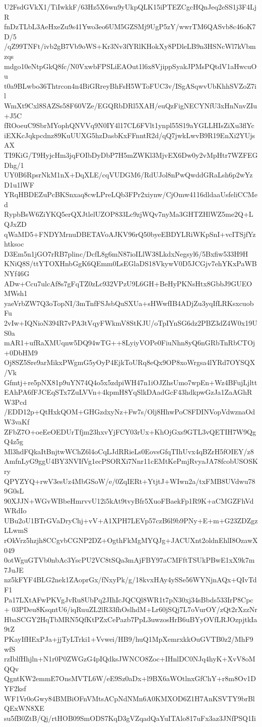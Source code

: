 U2FsdGVkX1/TiIwkkF/63Hz5X6wn9yUkpQLK15iPTEZCgcHQnJeq2eSS1j3F4LjR
fnDzTLbL3AeHxeZu9s41Ywo3eo6UM5GZSMj9UgP5zY/wwrTM6QASvb8c46oK7D/5
/qZ99TNFt/ivb2gB7Vb9oWS+Kr3Nv3fYRlKHokXy8PDleLB9n3HSNcWl7kVbmzqs
mdgo10eNtpGkQ8fc/N0VxwbFPSLiEAOut1l6x8VjippSyakJPMsPQtdV1aHwcuOu
t0a9BLwbo36Thtrcon4n4BiGRreyBhFsH5WToFUC3v/ISgASqwvUbKhhSVZoZ7il
WmXt9Cxl8SAZSs58F60VZe/EGQRbDRl5XAH/euQzFigNECYNfU3xHnNnvZIu+J5C
fROoeuC9SbrMYophQNVVq9N0IY4l17CL6FVlt1ynpl55S19aYGLLHIsZiXu3flYc
iEXKcJqkpcdnz89KuUUXG5hzDasbKxFFnntR2d/qQ7jwkLwvB9R19EnXi2YUjsAX
TI9KiG/T9HyjcHm3jqFOIbDyDbP7H5mZWKl3MjvEX6Dw0y2vMpHtr7WZFEGDhg/1
UY0B6RpsrNkM1nX+DqXLE/cqVUDGM6/RdUJol8nPwQwddGRaLsh6p2wYzD1u1lWF
YRqHBDEZuPcBKSnxaq8cwLPreLQb3FPr2xiynw/CjOmw4116dldaaUsfeliCCMed
RypbBsW6ZiYKQ5erQXJtlelUZOP833Lc9zjWQv7nyMa3GHTZHlWZ5me2Q+LQJxZD
qWaMD5+FNDYMrnuDBETAVoAJKV96rQ50byeEBDYLRiWKpSnI+vcITSjfYzhtksoc
D3Em5n1jGO7rRB7plinc/DcfL8g6mN87ioILlW38LkdxNegsyl6/5Bxfiw533H9H
KNiQ8S/ttYTOXHnbGgK6QEmm0LsEGlaDS18VkywV0D5JCGjv7ehYKxPaWBNYf46G
ADw+Ccu7ulcAf8s7gFqTZ0zLc932VPzU9L6GH+BeHyPKNsHtx8GbbJ9GUEOMWsh1
yaeVrbZW7Q3oTopNI/3mTnfFSJsbQuSXUa+sHWwfIB4ADjZu3yqIfLRKsxcuobFu
2vIw+IQNioN394R7vPA3tVqyFWkmV8StKJU/oTpIYnSG6dz2PBZ3dZ4W0x19US0a
mAR1+ufRaXMUqnw5DQ94wTG++8LyiyVOPe0FiuNhn8yQ6nGRbTnRbCTOj+0DbHM9
Oj8SZ5Sre9arMikxPWgmG5yOyP4EjkToURq8eQx9OP8xoWrgsa4lYRd7OYSQX/Vk
Gfmtj+re5pNX81p9uYN74Q4o5x5zdpiWH47n1iOJZhsUmo7wpEn+Wz4BFujLjltt
EAhPA6fFJCEqSTx7ZuLVVn+4kpmH8YqSlkDAadGcF43hdkpwGzJa1ZaAGhRW3Pcd
/EDD12p+QtHxkQOM+GHGzdxyNz+Fw7s/Olj8HhwPoC8FDINVopVdwznaOdW3vaKf
ZFbZ7O+oeEeOEDUrTfjm23hxvYjFCY03rUx+KhOjGxs9GTL3vQETIH7W9QgQ4z5g
Ml3hdFQkaItBnjtwWChZ6l4oCqLJdRRieLs0EovsGfqTIhUvx4qBZrH5fOIEY/z8
AmfnLyG9ggU4BY3NVIfVg1ecPSORXi7Nnr11cEMtKePmjRvyaJA78fcobUSOSKry
QPYZYQ+rwV3esUz4MbGSoW/e/0ZqIERt+YtjtJ+WIwn2a/txFMB8UVdwu789G0sL
90XJJN+WGvWBbeHmrvvU12i5kAt9tvyBfr5XuoFBaekFp1R9K+aCMGZFhVdWRdIo
UBu2oU1BTrGVaDryChj+vV+A1XPH7LEVp57czB6l9b9PNy+E+m+G23ZDZgzLLwmS
rOkVrz5hzjh8CCgvbCGNP2DZ+OgthFkMgMYQJg+JACUXnt2oldnEhlI8OzawX049
0otWguGTVb0nbAc3YscPU2VC8tSQa3mAjFBY97aCMFftTSUkPBwE1xX9k7m7JuJE
nz5kFYF4BLG2nek1ZAoprGx/fNxyPk/g/18kvxHAy4ySSe56WYNjnAQx+QIvTdF1
Pa17LXtAFwPKVgJvRu8UbPq2JIhIcJQCQl8WR1t7pN30xj34sBbds533IrP8Cpc+
03PDeu8KsqntU6/iqRuuZL2lR33fhOslhdM+Lr60jSQj7L7oVurOY/zQt2rXzzNr
HbaSCGY2HqTbMRN5QfKtPZxCePazb7PpL3uwzosHrB6uBYyOVfLRJOzpjtkIa9tZ
PKayIfHExPJa+jjTyLTrki1+Vvwei/HB9/huQ1MpXemrxkkOuGVTB0z2/MhF9wfS
rzIblfHhjln+N1r0P0ZWGzG4pIQdksJWNCO8Zoc+IHnlDC0NJq4hyK+XvV8oMQQv
QgntKW2emmE7OnsMVTL6W/eE9Sz0aDx+l9BX6aWOtlnxGfChY+r8m8Ov1DYF2ksf
WF1Vr0oGwy84BMBiOFnVMtsACpNdNMn6A0KMXOD6Z1H7AnKSVTY9brBlQExWN8XE
su5fB0ZtB/Qj/rtHOB09SmODS7KqD3gVZqadQaYuITAlo817uFx3az3JNfPSQ1Ii
